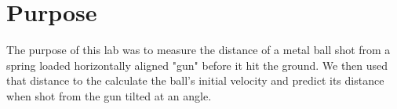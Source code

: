 
\section{Purpose}
\vspace{-0.5cm}
\singlespacing
The purpose of this lab was to measure the distance of a metal ball shot from a spring loaded horizontally aligned "gun" before it hit the ground. We then used that distance to the calculate the ball's initial velocity and predict its distance when shot from the gun tilted at an angle.

